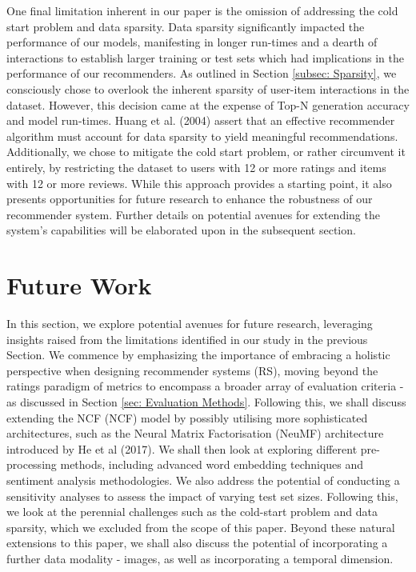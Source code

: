 One final limitation inherent in our paper is the omission of addressing the cold start problem and data sparsity. Data sparsity significantly impacted the performance of our models, manifesting in longer run-times and a dearth of interactions to establish larger training or test sets which had implications in the performance of our recommenders.  As outlined in Section \ref{subsec: Sparsity}, we consciously chose to overlook the inherent sparsity of user-item interactions in the dataset. However, this decision came at the expense of Top-N generation accuracy and model run-times. Huang et al. (2004) assert that an effective recommender algorithm must account for data sparsity to yield meaningful recommendations. Additionally, we chose to mitigate the cold start problem, or rather circumvent it entirely, by restricting the dataset to users with 12 or more ratings and items with 12 or more reviews. While this approach provides a starting point, it also presents opportunities for future research to enhance the robustness of our recommender system. Further details on potential avenues for extending the system's capabilities will be elaborated upon in the subsequent section.


\section{Future Work}
\label{sec:Future Work}

In this section, we explore potential avenues for future research, leveraging insights raised from the limitations identified in our study in the previous Section. We commence by emphasizing the importance of embracing a holistic perspective when designing recommender systems (RS), moving beyond the ratings paradigm of metrics to encompass a broader array of evaluation criteria - as discussed in Section \ref{sec: Evaluation Methods}. Following this, we shall discuss extending the NCF (NCF) model by possibly utilising more sophisticated architectures, such as the Neural Matrix Factorisation (NeuMF) architecture introduced by He et al (2017). We shall then look at exploring different pre-processing methods, including advanced word embedding techniques and sentiment analysis methodologies. We also address the potential of conducting a sensitivity analyses to assess the impact of varying test set sizes. Following this, we look at the perennial challenges such as the cold-start problem and data sparsity, which we excluded from the scope of this paper. Beyond these natural extensions to this paper, we shall also discuss the potential of incorporating a further data modality - images, as well as incorporating a temporal dimension. 

